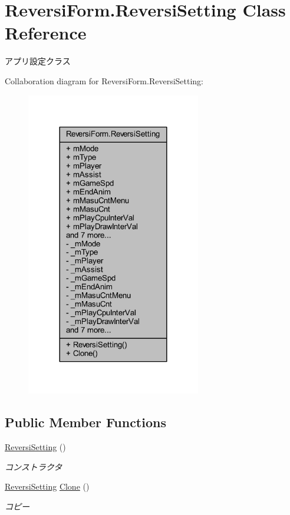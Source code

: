\hypertarget{class_reversi_form_1_1_reversi_setting}{}\section{Reversi\+Form.\+Reversi\+Setting Class Reference}
\label{class_reversi_form_1_1_reversi_setting}


アプリ設定クラス  




Collaboration diagram for Reversi\+Form.\+Reversi\+Setting\+:
\nopagebreak
\begin{figure}[H]
\begin{center}
\leavevmode
\includegraphics[width=216pt]{class_reversi_form_1_1_reversi_setting__coll__graph}
\end{center}
\end{figure}
\subsection*{Public Member Functions}
\begin{DoxyCompactItemize}
\item 
\hyperlink{class_reversi_form_1_1_reversi_setting_a985e02a2cbf355f46474efc51a5b3728}{Reversi\+Setting} ()
\begin{DoxyCompactList}\small\item\em コンストラクタ \end{DoxyCompactList}\item 
\hyperlink{class_reversi_form_1_1_reversi_setting}{Reversi\+Setting} \hyperlink{class_reversi_form_1_1_reversi_setting_a5ba1f3b862a9938fb89045c3b22dec51}{Clone} ()
\begin{DoxyCompactList}\small\item\em コピー \end{DoxyCompactList}\end{DoxyCompactItemize}
